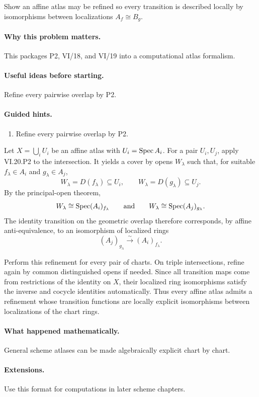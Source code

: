 \begin{problem}\label{prob:vi20-p20}
Show an affine atlas may be refined so every transition is described locally by isomorphisms between localizations $A_f\cong B_g$.
\end{problem}

\ifdefined\FullProblemDossiers
\paragraph{Why this problem matters.}
This packages P2, VI/18, and VI/19 into a computational atlas formalism.

\paragraph{Useful ideas before starting.}
Refine every pairwise overlap by P2.

\paragraph{Guided hints.}
\begin{enumerate}
\item Refine every pairwise overlap by P2.
\end{enumerate}

\begin{solution}
Let $X=\bigcup_iU_i$ be an affine atlas with $U_i=\operatorname{Spec} A_i$.  For a pair $U_i,U_j$, apply VI.20.P2 to the intersection.  It yields a cover by opens $W_\lambda$ such that, for suitable $f_\lambda\in A_i$ and $g_\lambda\in A_j$,
\[
W_\lambda=D(f_\lambda)\subseteq U_i,
\qquad
W_\lambda=D(g_\lambda)\subseteq U_j.
\]
By the principal-open theorem,
\[
W_\lambda\cong\operatorname{Spec}(A_i)_{f_\lambda}
\qquad\text{and}\qquad
W_\lambda\cong\operatorname{Spec}(A_j)_{g_\lambda}.
\]
The identity transition on the geometric overlap therefore corresponds, by affine anti-equivalence, to an isomorphism of localized rings
\[
(A_j)_{g_\lambda}\xrightarrow{\sim}(A_i)_{f_\lambda}.
\]

Perform this refinement for every pair of charts.  On triple intersections, refine again by common distinguished opens if needed.  Since all transition maps come from restrictions of the identity on $X$, their localized ring isomorphisms satisfy the inverse and cocycle identities automatically.  Thus every affine atlas admits a refinement whose transition functions are locally explicit isomorphisms between localizations of the chart rings.
\end{solution}


\paragraph{What happened mathematically.}
General scheme atlases can be made algebraically explicit chart by chart.

\paragraph{Extensions.}
Use this format for computations in later scheme chapters.
\fi
